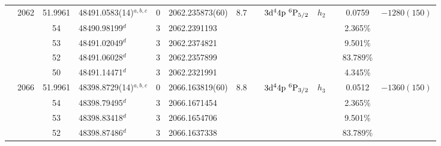\begin{table*}
\begin{center}
{\begin{tabular}{:l;l;c;l;c;l;c;l;l;c;c;c;c}
                                  & 2062   & 51.9961   & 48491.0583(14)$^{a,b,c}$         & 0 &   2062.235873(60)  &  8.7 & $                                        $ & $3\rm{d}^44\rm{p}~^6\rm{P}_{5/2}         $ & $h_{2} $ &              & 0.0759    & $-1280(150)$\\
\rowstyle{\itshape}               &        & 54        & 48490.98199$^{d}$                & 3 &  2062.2391193      &      & $                                        $ & $                                        $ & $      $ &              & 2.365\%   & $          $\\
\rowstyle{\itshape}               &        & 53        & 48491.02049$^{d}$                & 3 &  2062.2374821      &      & $                                        $ & $                                        $ & $      $ &              & 9.501\%   & $          $\\
\rowstyle{\itshape}               &        & 52        & 48491.06028$^{d}$                & 3 &  2062.2357899      &      & $                                        $ & $                                        $ & $      $ &              & 83.789\%  & $          $\\
\rowstyle{\itshape}               &        & 50        & 48491.14471$^{d}$                & 3 &  2062.2321991      &      & $                                        $ & $                                        $ & $      $ &              & 4.345\%   & $          $\\
                                  & 2066   & 51.9961   & 48398.8729(14)$^{a,b,c}$         & 0 &   2066.163819(60)  &  8.8 & $                                        $ & $3\rm{d}^44\rm{p}~^6\rm{P}_{3/2}         $ & $h_{3} $ &              & 0.0512    & $-1360(150)$\\
\rowstyle{\itshape}               &        & 54        & 48398.79495$^{d}$                & 3 &  2066.1671454      &      & $                                        $ & $                                        $ & $      $ &              & 2.365\%   & $          $\\
\rowstyle{\itshape}               &        & 53        & 48398.83418$^{d}$                & 3 &  2066.1654706      &      & $                                        $ & $                                        $ & $      $ &              & 9.501\%   & $          $\\
\rowstyle{\itshape}               &        & 52        & 48398.87486$^{d}$                & 3 &  2066.1637338      &      & $                                        $ & $                                        $ & $      $ &              & 83.789\%  & $          $\\

\end{tabular}}
\end{center}
\end{table*}

